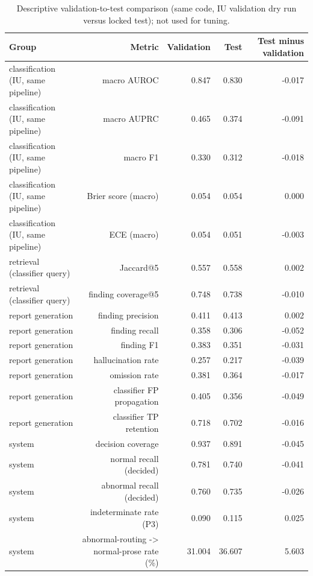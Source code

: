 \begin{table}[t]
\centering
\scriptsize
\begin{tabular}{lrrrr}
\hline
Group & Metric & Validation & Test & Test minus validation \\
\hline
classification (IU, same pipeline) & macro AUROC & 0.847 & 0.830 & -0.017 \\
classification (IU, same pipeline) & macro AUPRC & 0.465 & 0.374 & -0.091 \\
classification (IU, same pipeline) & macro F1 & 0.330 & 0.312 & -0.018 \\
classification (IU, same pipeline) & Brier score (macro) & 0.054 & 0.054 & 0.000 \\
classification (IU, same pipeline) & ECE (macro) & 0.054 & 0.051 & -0.003 \\
retrieval (classifier query) & Jaccard@5 & 0.557 & 0.558 & 0.002 \\
retrieval (classifier query) & finding coverage@5 & 0.748 & 0.738 & -0.010 \\
report generation & finding precision & 0.411 & 0.413 & 0.002 \\
report generation & finding recall & 0.358 & 0.306 & -0.052 \\
report generation & finding F1 & 0.383 & 0.351 & -0.031 \\
report generation & hallucination rate & 0.257 & 0.217 & -0.039 \\
report generation & omission rate & 0.381 & 0.364 & -0.017 \\
report generation & classifier FP propagation & 0.405 & 0.356 & -0.049 \\
report generation & classifier TP retention & 0.718 & 0.702 & -0.016 \\
system & decision coverage & 0.937 & 0.891 & -0.045 \\
system & normal recall (decided) & 0.781 & 0.740 & -0.041 \\
system & abnormal recall (decided) & 0.760 & 0.735 & -0.026 \\
system & indeterminate rate (P3) & 0.090 & 0.115 & 0.025 \\
system & abnormal-routing -> normal-prose rate (\%) & 31.004 & 36.607 & 5.603 \\
\hline
\end{tabular}
\caption{Descriptive validation-to-test comparison (same code, IU validation dry run versus locked test); not used for tuning.}
\label{tab:table8_validation_to_test_comparison}
\end{table}
